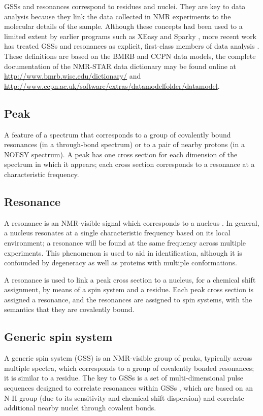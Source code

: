 GSSs \cite{saga, ezassign, pistachio, autoassign1997, autoassign2001}
and resonances \cite{ccpn} correspond to residues and nuclei.
They are key to data analysis because they link the data collected in NMR
experiments to the molecular details of the sample.
Although these concepts had been used to a limited extent by earlier programs
such as XEasy and Sparky \cite{xeasy, sparky}, more recent work has treated 
GSSs and resonances as explicit, first-class members of data analysis 
\cite{ccpn, bmrb}.  These definitions are based on the BMRB and CCPN data models,
the complete documentation of the NMR-STAR data dictionary may be found online 
at \url{http://www.bmrb.wisc.edu/dictionary/} and
\url{http://www.ccpn.ac.uk/software/extras/datamodelfolder/datamodel}.

\subsection*{Peak}
A feature of a spectrum that corresponds to a group of covalently bound
resonances (in a through-bond spectrum) or to a pair of nearby protons
(in a NOESY spectrum).  A peak has one cross section
for each dimension of the spectrum in which it appears; each cross section
corresponds to a resonance at a characteristic frequency.

\subsection*{Resonance}
A resonance is an NMR-visible signal which corresponds to a nucleus \cite{ccpn}.
In general, a nucleus resonates at a single characteristic frequency based
on its local environment;  a resonance will be found at the same 
frequency across multiple experiments.  This phenomenon is used to aid in 
identification, although it is confounded by degeneracy as well as proteins
with multiple conformations.

A resonance is used to link a peak cross section to a nucleus, for a chemical 
shift assignment, by means of a spin system and a residue.  Each peak cross 
section is assigned a resonance, and the resonances are assigned to spin 
systems, with the semantics that they are covalently bound.

\subsection*{Generic spin system}
A generic spin system (GSS) is an NMR-visible group of peaks, typically 
across multiple spectra, which corresponds to a group of covalently bonded 
resonances; it is similar to a residue.  
The key to GSSs is a set of multi-dimensional pulse 
sequences designed to correlate resonances within GSSs 
\cite{cavanagh1995protein, hncacb, hnco, cbcaconh}, which are
based on an N-H group (due to its sensitivity and chemical shift dispersion)
and correlate additional nearby nuclei through covalent bonds.

